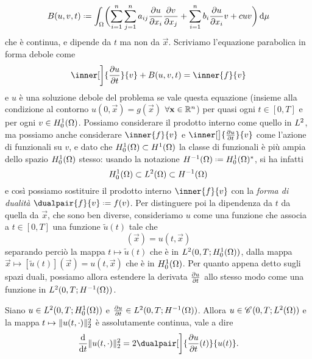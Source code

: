 \begin{equation}
    B(u,v,t)\defeq\int_\Omega\biggl(\sum_{i=1}^n\sum_{j=1}^na_{ij}\drp{u}{x_i}\drp{v}{x_j}+\sum_{i=1}^nb_i\drp{u}{x_i}v+cuv\biggr)\,\dd\mu
    \label{eq:forma-bilineare-parabolica}
\end{equation}
che è continua, e dipende da $t$ ma non da $\vec x$.
Scriviamo l'equazione parabolica in forma debole come
\begin{equation}
    \inner[\bigg]{\drp{u}{t}}{v}+B(u,v,t)=\inner{f}{v}
    \label{eq:equazione-parabolica-debole}
\end{equation}
e $u$ è una soluzione debole del problema se vale questa equazione (insieme alla condizione al contorno $u(0,\vec x)=g(\vec x)$ $\forall\vec x\in\R^n$) per quasi ogni $t\in[0,T]$ e per ogni $v\in\sobHc[1]{\Omega}$.
Possiamo considerare il prodotto interno come quello in $\lclass[2]$, ma possiamo anche considerare $\inner{f}{v}$ e $\inner[\big]{\drp{u}{t}}{v}$ come l'azione di funzionali su $v$, e dato che $\sobHc[1]{\Omega}\subset\sobH[1]{\Omega}$ la classe di funzionali è più ampia dello spazio $\sobHc[1]{\Omega}$ stesso: usando la notazione $\sobH[-1]{\Omega}\defeq\dual{\sobHc[1]{\Omega}}$, si ha infatti
\begin{equation}
    \sobHc[1]{\Omega}\subset\leb[2]{\Omega}\subset\sobH[-1]{\Omega}
\end{equation}
e cos\`i possiamo sostituire il prodotto interno $\inner{f}{v}$ con la \emph{forma di dualità} $\dualpair{f}{v}\defeq f(v)$.
Per distinguere poi la dipendenza da $t$ da quella da $\vec x$, che sono ben diverse, consideriamo $u$ come una funzione che associa a $t\in[0,T]$ una funzione $\tilde{u}(t)$ tale che
\begin{equation}
    [\tilde{u}(t)](\vec x)=u(t,\vec x)
\end{equation}
separando perciò la mappa $t\mapsto\tilde{u}(t)$ che è in $\leb[2]{0,T;\sobHc[1]{\Omega}}$, dalla mappa $\vec x\mapsto[\tilde{u}(t)](\vec x)=u(t,\vec x)$ che è in $\sobHc[1]{\Omega}$.
Per quanto appena detto sugli spazi duali, possiamo allora estendere la derivata $\drp{u}{t}$ allo stesso modo come una funzione in $\leb[2]{0,T;\sobH[-1]{\Omega}}$.
\begin{teorema}
    Siano $u\in\leb[2]{0,T;\sobHc[1]{\Omega}}$ e $\drp{u}{t}\in\leb[2]{0,T;\sobH[-1]{\Omega}}$.
    Allora $u\in\cont{0,T;\leb[2]{\Omega}}$ e la mappa $t\mapsto\norm{u(t,\cdot)}_2^2$ è assolutamente continua, vale a dire
    \begin{equation}
        \drv{}{t}\norm{u(t,\cdot)}_2^2=2\dualpair[\bigg]{\drp{u}{t}(t)}{u(t)}.
    \end{equation}
\end{teorema}
